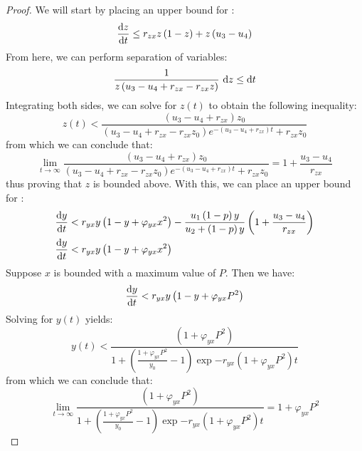 \begin{proof}
    We will start by placing an upper bound for :
    \begin{equation*}
        \diff[]{z}{t} \leq r_{zx}z\left(1-z\right)+z\left(u_3-u_4\right)
    \end{equation*}
    From here, we can perform separation of variables:
    \begin{equation*}
        \frac{1}{z\left(u_3-u_4+r_{zx}-r_{zx}z\right)}\ \opdiff{z} \leq \opdiff{t}
    \end{equation*}
    Integrating both sides, we can solve for $z(t)$ to obtain the following inequality:
    \begin{equation*}
        z(t) < \frac{\left(u_3-u_4+r_{zx}\right)z_0}{\left(u_3-u_4+r_{zx}-r_{zx}z_0\right)e^{-\left(u_3-u_4+r_{zx}\right)t}+r_{zx}z_0}
    \end{equation*}
    from which we can conclude that:
    \begin{equation*}
        \lim_{t\to\infty} \frac{\left(u_3-u_4+r_{zx}\right)z_0}{\left(u_3-u_4+r_{zx}-r_{zx}z_0\right)e^{-\left(u_3-u_4+r_{zx}\right)t}+r_{zx}z_0} = 1+\frac{u_3-u_4}{r_{zx}}
    \end{equation*}
    thus proving that $z$ is bounded above. With this, we can place an upper bound for :
    \begin{align*}
        \diff[]{y}{t} &< r_{yx}y\left(1-y+\varphi_{yx}x^2\right)-\frac{u_1\left(1-p\right)y}{u_2+\left(1-p\right)y}\left(1+\frac{u_3-u_4}{r_{zx}}\right)\\
        \diff[]{y}{t} &< r_{yx}y\left(1-y+\varphi_{yx}x^2\right)
    \end{align*}
    Suppose $x$ is bounded with a maximum value of $P$. Then we have:
    \begin{equation*}
        \diff[]{y}{t} < r_{yx}y\left(1-y+\varphi_{yx}P^2\right)
    \end{equation*}
    Solving for $y(t)$ yields:
    \begin{equation*}
        y(t) < \frac{\left(1+\varphi_{yx}P^2\right)}{1+\left(\frac{1+\varphi_{yx}P^2}{y_0}-1\right)\exp{-r_{yx}\left(1+\varphi_{yx}P^2\right)t}}
    \end{equation*}
    from which we can conclude that:
    \begin{equation*}
        \lim_{t\to\infty} \frac{\left(1+\varphi_{yx}P^2\right)}{1+\left(\frac{1+\varphi_{yx}P^2}{y_0}-1\right)\exp{-r_{yx}\left(1+\varphi_{yx}P^2\right)t}} = 1+\varphi_{yx}P^2

\end{equation*}
\end{proof}
